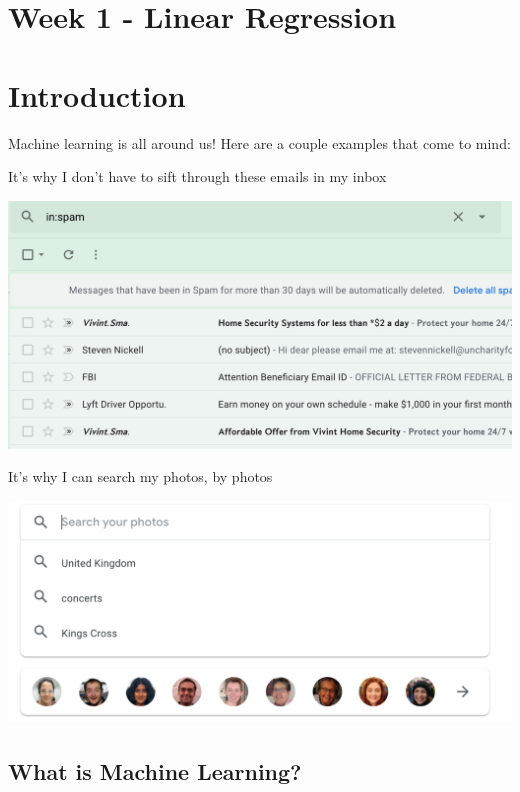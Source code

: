 \documentclass[12pt]{article}
\begin{document}
\section{Week 1 - Linear Regression}
\section{Introduction}

Machine learning is all around us! Here are a couple examples that come to mind:


It's why I don't have to sift through these emails in my inbox

\includegraphics[width=\textwidth]{spam}

It's why I can search my photos, by photos

\includegraphics[width=\textwidth]{photo-search}

\subsection{What is Machine Learning?}
\end{document}
